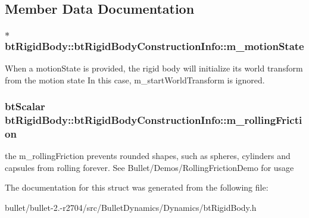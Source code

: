 \subsection{Member Data Documentation}
\hypertarget{structbt_rigid_body_1_1bt_rigid_body_construction_info_a729b0b79412f36ac983d4adafbffa429}{
\subsubsection[{m\+\_\+motion\+State}]{$\ast$ bt\+Rigid\+Body\+::bt\+Rigid\+Body\+Construction\+Info\+::m\+\_\+motion\+State}}\label{structbt_rigid_body_1_1bt_rigid_body_construction_info_a729b0b79412f36ac983d4adafbffa429}
When a motion\+State is provided, the rigid body will initialize its world transform from the motion state In this case, m\+\_\+start\+World\+Transform is ignored. \hypertarget{structbt_rigid_body_1_1bt_rigid_body_construction_info_abb72d0a00d035d2224a927810e9ed972}{
\subsubsection[{m\+\_\+rolling\+Friction}]{\setlength{\rightskip}{0pt plus 5cm}bt\+Scalar bt\+Rigid\+Body\+::bt\+Rigid\+Body\+Construction\+Info\+::m\+\_\+rolling\+Friction}}\label{structbt_rigid_body_1_1bt_rigid_body_construction_info_abb72d0a00d035d2224a927810e9ed972}
the m\+\_\+rolling\+Friction prevents rounded shapes, such as spheres, cylinders and capsules from rolling forever. See Bullet/\+Demos/\+Rolling\+Friction\+Demo for usage 

The documentation for this struct was generated from the following file\+:\begin{DoxyCompactItemize}
\item 
bullet/bullet-\/2.-\/r2704/src/\+Bullet\+Dynamics/\+Dynamics/bt\+Rigid\+Body.\+h\end{DoxyCompactItemize}
